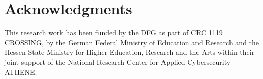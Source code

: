 \section*{Acknowledgments}

This research work has been funded by the DFG as part of CRC 1119 CROSSING, by the German Federal Ministry of Education and Research and the Hessen State Ministry for Higher Education, Research and the Arts within their joint support of the National Research Center for Applied Cybersecurity ATHENE.